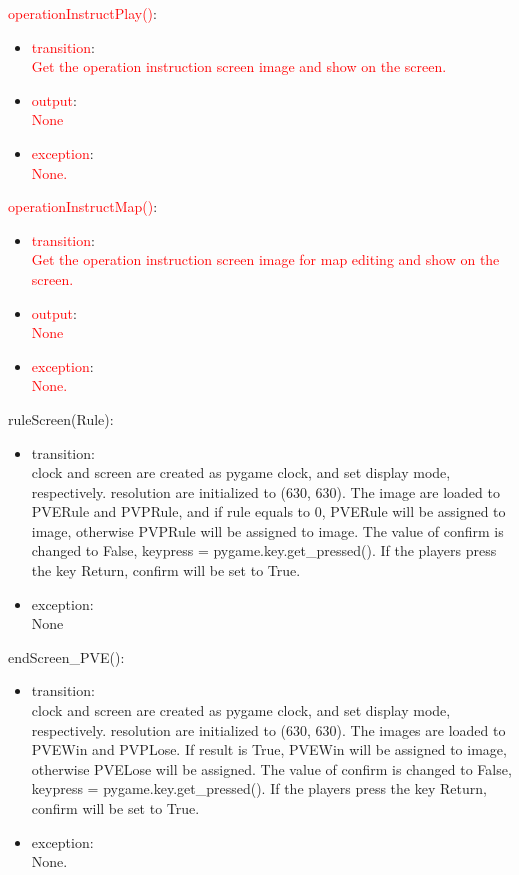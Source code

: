 \documentclass[12pt, titlepage]{article}
\begin{document}
		\textcolor{red}{operationInstructPlay()}:
		\begin{itemize}
		\item \textcolor{red}{transition}:\\ \textcolor{red}{Get the operation instruction screen image and show on the screen.}
		\item \textcolor{red}{output}:\\\textcolor{red}{None}
		\item \textcolor{red}{exception}:\\\textcolor{red}{None.}
		\end{itemize}
		
		\textcolor{red}{operationInstructMap()}:
		\begin{itemize}
		\item \textcolor{red}{transition}:\\ \textcolor{red}{Get the operation instruction screen image for map editing and show on the screen.}
		\item \textcolor{red}{output}:\\\textcolor{red}{None}
		\item \textcolor{red}{exception}:\\\textcolor{red}{None.}
		\end{itemize}
		
		ruleScreen(Rule):
		\begin{itemize}
		\item transition:\\clock and screen are created as pygame clock, and set display mode, respectively. resolution are initialized to (630, 630). The image are loaded to PVERule and PVPRule, and if rule equals to 0, PVERule will be assigned to image, otherwise PVPRule will be assigned to image. The value of confirm is changed to False, keypress = pygame.key.get\_pressed(). If the players press the key Return, confirm will be set to True.
		\item exception:\\ None
		\end{itemize}
		
		endScreen\_PVE():
		\begin{itemize}
		\item transition: \\clock and screen are created as pygame clock, and set display mode, respectively. resolution are initialized to (630, 630). The images are loaded to PVEWin and PVPLose. If result is True, PVEWin will be assigned to image, otherwise PVELose will be assigned. The value of confirm is changed to False, keypress = pygame.key.get\_pressed(). If the players press the key Return, confirm will be set to True.
		\item exception: \\None.
		\end{itemize}
		
\end{document}
